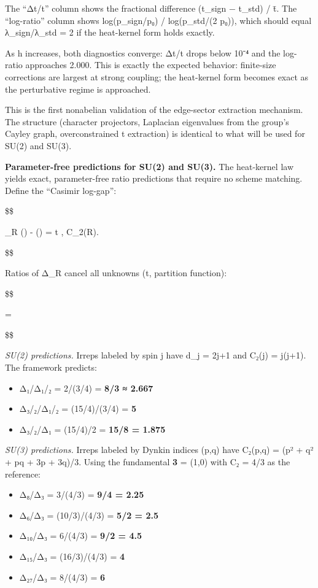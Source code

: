 \documentclass[11pt,a4paper]{article}
\theoremstyle{remark}
\providecommand{\tightlist}{%
  \setlength{\itemsep}{0pt}\setlength{\parskip}{0pt}}
\begin{document}
The ``Δt/t'' column shows the fractional difference (t\_sign −
t\_std) / t̄. The ``log-ratio'' column shows
log(p\_sign/p₀) / log(p\_std/(2 p₀)), which should
equal λ\_sign/λ\_std = 2 if the heat-kernel
form holds exactly.

As h increases, both diagnostics converge: Δt/t drops below 10⁻⁴
and the log-ratio approaches 2.000. This is exactly the expected behavior:
finite-size corrections are largest at strong coupling; the heat-kernel form
becomes exact as the perturbative regime is approached.

This is the first nonabelian validation of the edge-sector extraction mechanism.
The structure (character projectors, Laplacian eigenvalues from the group's
Cayley graph, overconstrained t extraction) is identical to what will be used
for SU(2) and SU(3).

\textbf{Parameter-free predictions for SU(2) and SU(3).} The heat-kernel law yields
exact, parameter-free ratio predictions that require no scheme matching. Define
the ``Casimir log-gap'':

\$\$

\Delta\_R \equiv \ln\left(\right) - \ln\left(\right)
= t , C\_2(R).

\$\$

Ratios of Δ\_R cancel all unknowns (t, partition function):

\$\$

 = 
\quad {}

\$\$

\emph{SU(2) predictions.} Irreps labeled by spin j have d\_j = 2j+1 and
C₂(j) = j(j+1). The framework predicts:

\begin{itemize}
\tightlist
\item
  Δ₁/Δ₁/₂ = 2/(3/4) = \textbf{8/3 ≈ 2.667}
\item
  Δ₃/₂/Δ₁/₂ = (15/4)/(3/4) = \textbf{5}
\item
  Δ₃/₂/Δ₁ = (15/4)/2 = \textbf{15/8 = 1.875}
\end{itemize}

\emph{SU(3) predictions.} Irreps labeled by Dynkin indices (p,q) have
C₂(p,q) = (p² + q² + pq + 3p + 3q)/3. Using the fundamental \textbf{3} = (1,0)
with C₂ = 4/3 as the reference:

\begin{itemize}
\tightlist
\item
  Δ₈/Δ₃ = 3/(4/3) = \textbf{9/4 = 2.25}
\item
  Δ₆/Δ₃ = (10/3)/(4/3) = \textbf{5/2 = 2.5}
\item
  Δ₁₀/Δ₃ = 6/(4/3) = \textbf{9/2 = 4.5}
\item
  Δ₁₅/Δ₃ = (16/3)/(4/3) = \textbf{4}
\item
  Δ₂₇/Δ₃ = 8/(4/3) = \textbf{6}
\end{itemize}
\end{document}
